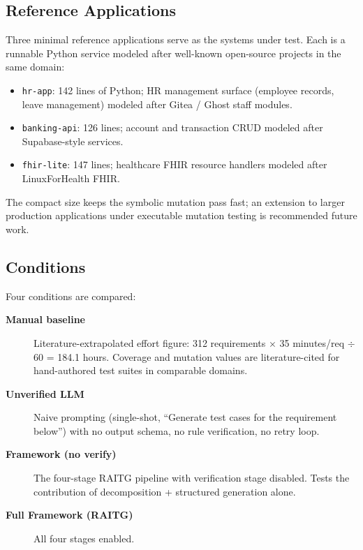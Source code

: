 \documentclass[10pt,twocolumn,letterpaper]{article}
\begin{document}
\subsection{Reference Applications}

Three minimal reference applications serve as the systems under test.
Each is a runnable Python service modeled after well-known open-source
projects in the same domain:

\begin{itemize}
  \item \texttt{hr-app}: 142 lines of Python; HR management surface
        (employee records, leave management) modeled after Gitea /
        Ghost staff modules.
  \item \texttt{banking-api}: 126 lines; account and transaction CRUD
        modeled after Supabase-style services.
  \item \texttt{fhir-lite}: 147 lines; healthcare FHIR resource
        handlers modeled after LinuxForHealth FHIR.
\end{itemize}

The compact size keeps the symbolic mutation pass fast; an extension
to larger production applications under executable mutation testing
is recommended future work.

\subsection{Conditions}

Four conditions are compared:

\begin{description}
  \item[\textbf{Manual baseline}] Literature-extrapolated effort
        figure: 312 requirements $\times$ 35 minutes/req $\div$ 60 =
        184.1 hours. Coverage and mutation values are
        literature-cited for hand-authored test suites in comparable
        domains.
  \item[\textbf{Unverified LLM}] Naive prompting (single-shot,
        ``Generate test cases for the requirement below'') with no
        output schema, no rule verification, no retry loop.
  \item[\textbf{Framework (no verify)}] The four-stage RAITG pipeline
        with verification stage disabled. Tests the contribution of
        decomposition + structured generation alone.
  \item[\textbf{Full Framework (RAITG)}] All four stages enabled.
\end{description}
\end{document}
